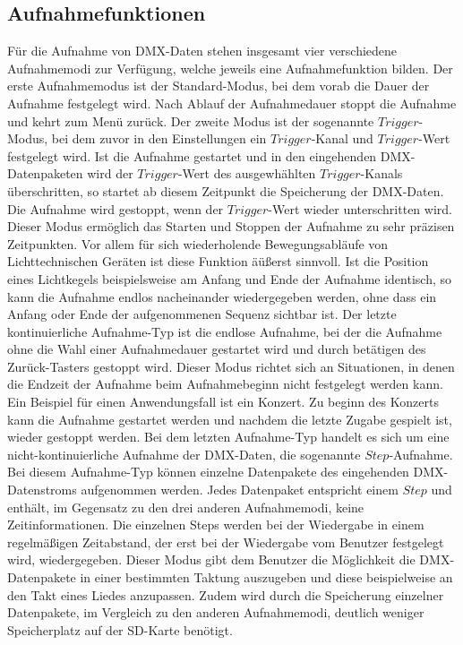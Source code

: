 
\subsection{Aufnahmefunktionen}
\label{sec:recfunctions}
Für die Aufnahme von DMX-Daten stehen insgesamt vier verschiedene Aufnahmemodi zur Verfügung, welche jeweils eine Aufnahmefunktion bilden. Der erste Aufnahmemodus ist der Standard-Modus, bei dem vorab die Dauer der Aufnahme festgelegt wird. Nach Ablauf der Aufnahmedauer stoppt die Aufnahme und kehrt zum Menü zurück. Der zweite Modus ist der sogenannte $Trigger$-Modus, bei dem zuvor in den Einstellungen ein $Trigger$-Kanal und $Trigger$-Wert festgelegt wird. Ist die Aufnahme gestartet und in den eingehenden DMX-Datenpaketen wird der $Trigger$-Wert des ausgewhählten $Trigger$-Kanals überschritten, so startet ab diesem Zeitpunkt die Speicherung der DMX-Daten. Die Aufnahme wird gestoppt, wenn der $Trigger$-Wert wieder unterschritten wird. Dieser Modus ermöglich das Starten und Stoppen der Aufnahme zu sehr präzisen Zeitpunkten. Vor allem für sich wiederholende Bewegungsabläufe von Lichttechnischen Geräten ist diese Funktion äüßerst sinnvoll. Ist die Position eines Lichtkegels beispielsweise am Anfang und Ende der Aufnahme identisch, so kann die Aufnahme endlos nacheinander wiedergegeben werden, ohne dass ein Anfang oder Ende der aufgenommenen Sequenz sichtbar ist. Der letzte kontinuierliche Aufnahme-Typ ist die endlose Aufnahme, bei der die Aufnahme ohne die Wahl einer Aufnahmedauer gestartet wird und durch betätigen des Zurück-Tasters gestoppt wird. Dieser Modus richtet sich an Situationen, in denen die Endzeit der Aufnahme beim Aufnahmebeginn nicht festgelegt werden kann. Ein Beispiel für einen Anwendungsfall ist ein Konzert. Zu beginn des Konzerts kann die Aufnahme gestartet werden und nachdem die letzte Zugabe gespielt ist, wieder gestoppt werden. Bei dem letzten Aufnahme-Typ handelt es sich um eine nicht-kontinuierliche Aufnahme der DMX-Daten, die sogenannte $Step$-Aufnahme. Bei diesem Aufnahme-Typ können einzelne Datenpakete des eingehenden DMX-Datenstroms aufgenommen werden. Jedes Datenpaket entspricht einem $Step$ und enthält, im Gegensatz zu den drei anderen Aufnahmemodi, keine Zeitinformationen. Die einzelnen Steps werden bei der Wiedergabe in einem regelmäßigen Zeitabstand, der erst bei der Wiedergabe vom Benutzer festgelegt wird, wiedergegeben. Dieser Modus gibt dem Benutzer die Möglichkeit die DMX-Datenpakete in einer bestimmten Taktung auszugeben und diese beispielweise an den Takt eines Liedes anzupassen. Zudem wird durch die Speicherung einzelner Datenpakete, im Vergleich zu den anderen Aufnahmemodi, deutlich weniger Speicherplatz auf der SD-Karte benötigt. 
